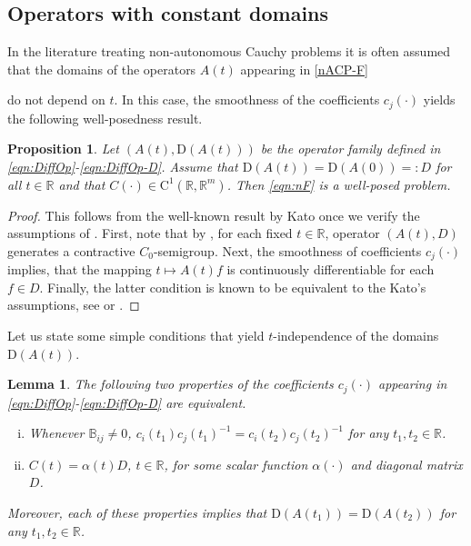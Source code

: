 \documentclass[a4paper,oneside,10pt]{amsart}
\newtheorem{lemma}[theorem]{Lemma}
\newtheorem{proposition}[theorem]{Proposition}
\theoremstyle{definition}
\numberwithin{equation}{section}
\def\dom{\mathrm{D}}
\def\RR{\mathbb{R}}
\begin{document}
\subsection{Operators with constant domains}\label{sec:ConstDom}

 In the literature treating non-autonomous Cauchy problems it is often assumed that the domains of the operators $A(t)$  appearing in \eqref{nACP-F}

do not depend on $t$.  In this case, the smoothness of the coefficients $c_j(\cdot)$ yields the following well-posedness result.
 
 \begin{proposition}
Let $(A(t),\dom(A(t)))$ be the operator family defined in \eqref{eqn:DiffOp}-\eqref{eqn:DiffOp-D}. Assume that $\dom(A(t)) = \dom(A(0)) =:D$ for all $t\in\RR$ and that $C(\cdot)\in\mathrm{C}^1(\RR,\RR^m)$. Then  \eqref{eqn:nF}
is a well-posed problem.
\end{proposition}
 
\begin{proof}
This follows from the well-known result by Kato once we verify the assumptions of \cite[Thm.~5]{K1953}. 
First, note that by \cite[Cor.~18.15]{BKR2017}, for each fixed $t\in\RR$, operator $(A(t),D)$ generates a contractive $C_0$-semigroup.
Next, the smoothness of coefficients $c_j(\cdot)$ implies, that the mapping $t\mapsto A(t)f$ is continuously differentiable for each $f\in D$.  Finally, the latter condition is  known  to be equivalent to the Kato's assumptions,  see \cite[Sect.~VI.9.5]{EN} or \cite[Prop.~2.1]{SG2014}.
\end{proof} 
 
Let us state some simple conditions that yield $t$-independence of the domains $\dom(A(t))$.

\begin{lemma}\label{lemma:ConstDom}
The following two properties of the coefficients $c_j(\cdot)$ appearing in  \eqref{eqn:DiffOp}-\eqref{eqn:DiffOp-D} are equivalent.
\begin{enumerate}[(i)]
\item Whenever $\mathbb{B}_{ij}\neq 0 $,
$c_i(t_1) c_j(t_1)^{-1} = c_i(t_2) c_j(t_2)^{-1}$ for any  $t_1,t_2 \in\RR$.
\item  $C(t)=\alpha(t) D$, $t\in\RR$, for some scalar function $\alpha(\cdot)$ and diagonal matrix $D$.
\end{enumerate}
Moreover, each of these properties implies  that $\dom(A(t_1)) = \dom(A(t_2))$ for any  $t_1,t_2 \in\RR$.
\end{lemma}
\end{document}
